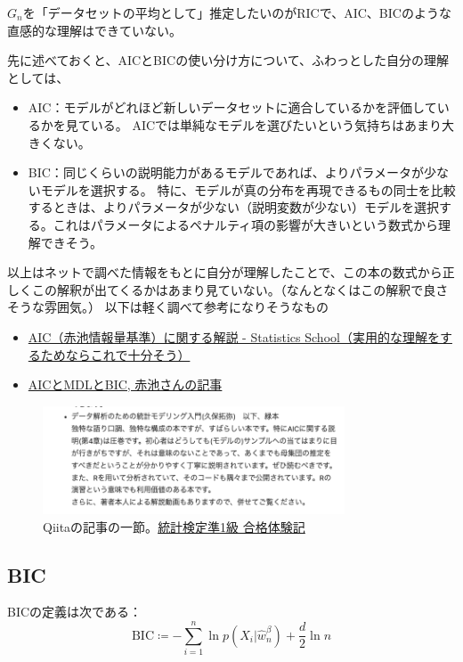 \documentclass[dvipdfmx]{jsarticle}
\begin{document}
$G_n$を「データセットの平均として」推定したいのがRICで、AIC、BICのような直感的な理解はできていない。

先に述べておくと、AICとBICの使い分け方について、ふわっとした自分の理解としては、
\begin{itemize}
    \item AIC：モデルがどれほど{\color{red}新しいデータセットに適合しているかを評価している}かを見ている。
    AICでは単純なモデルを選びたいという気持ちはあまり大きくない。
    \item BIC：{\color{red}同じくらいの説明能力があるモデルであれば、よりパラメータが少ないモデルを選択する。}
    特に、モデルが真の分布を再現できるもの同士を比較するときは、よりパラメータが少ない（説明変数が少ない）モデルを選択する。これはパラメータによるペナルティ項の影響が大きいという数式から理解できそう。
\end{itemize}
以上はネットで調べた情報をもとに自分が理解したことで、この本の数式から正しくこの解釈が出てくるかはあまり見ていない。（なんとなくはこの解釈で良さそうな雰囲気。）
以下は軽く調べて参考になりそうなもの
\begin{itemize}
    \item \href{https://statisticsschool.com/%E3%80%90%E3%83%A2%E3%83%87%E3%83%AB%E9%81%B8%E6%8A%9E%E3%80%91aic%E8%B5%A4%E6%B1%A0%E6%83%85%E5%A0%B1%E9%87%8F%E5%9F%BA%E6%BA%96%E3%81%AB%E3%81%A4%E3%81%84%E3%81%A6%E3%82%8F%E3%81%8B%E3%82%8A/}{AIC（赤池情報量基準）に関する解説 - Statistics School（実用的な理解をするためならこれで十分そう）}
    \item \href{https://orsj.org/wp-content/or-archives50/pdf/bul/Vol.41_07_375.pdf}{AICとMDLとBIC, 赤池さんの記事}
\end{itemize}

\begin{figure}[H]
    \centering
    \includegraphics[width=0.8\textwidth]{aic_qiita.png}
    \caption{Qiitaの記事の一節。\href{https://qiita.com/sflabtech/items/897eb2209a9b0adfeaa1}{統計検定準1級 合格体験記}}
    \label{fig:aic_qiita}    
\end{figure}

\subsection{BIC}
BICの定義は次である：
\begin{equation}
    \text{BIC} \coloneqq -\sum_{i=1}^{n}\ln{p(X_i|\hat{w}_n^{\beta})} + \frac{d}{2}\ln{n}
\end{equation}
\end{document}
